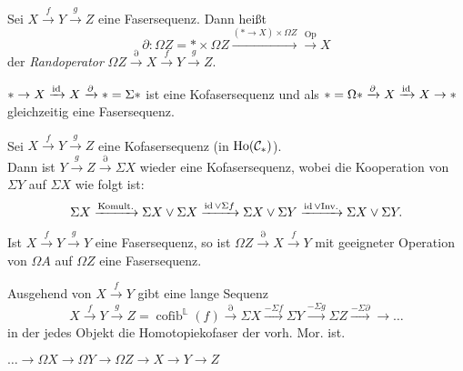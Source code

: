 \documentclass{cheat-sheet}
\DeclareMathOperator{\Ho}{Ho} %
\newcommand{\LL}{\mathbb{L}} %
\DeclareMathOperator{\cofib}{cofib} %
\begin{document}
\begin{dual}
  Sei $X \xrightarrow{f} Y \xrightarrow{g} Z$ eine Fasersequenz.
  Dann heißt
  \[ \partial : \Omega Z = * \times \Omega Z \xrightarrow{(* \to X) \times \Omega Z} \xrightarrow{\text{Op}} X \]
  der \emph{Randoperator} $\Omega Z \xrightarrow{\partial} X \xrightarrow{f} Y \xrightarrow{g} Z$.
\end{dual}

\begin{bsp}
  $* \to X \xrightarrow{\operatorname{id}} X \xrightarrow{\partial} * = \Sigma *$ ist eine Kofasersequenz und als
  $* = \Omega * \xrightarrow{\partial} X \xrightarrow{\operatorname{id}} X \to *$ gleichzeitig eine Fasersequenz.
\end{bsp}

\begin{prop}
  Sei $X \xrightarrow{f} Y \xrightarrow{g} Z$ eine Kofasersequenz (in $\Ho(\Cat_*)$). \\
  Dann ist $Y \xrightarrow{g} Z \xrightarrow{\partial} \Sigma X$ wieder eine Kofasersequenz, wobei die Kooperation von $\Sigma Y$ auf $\Sigma X$ wie folgt ist:
  \[ \Sigma X \xrightarrow{\text{Komult.}} \Sigma X \vee \Sigma X \xrightarrow{\operatorname{id} \vee \Sigma f} \Sigma X \vee \Sigma Y \xrightarrow{\operatorname{id} \vee \text{Inv.}} \Sigma X \vee \Sigma Y. \]
\end{prop}

\begin{dual}
  Ist $X \xrightarrow{f} Y \xrightarrow{g} Y$ eine Fasersequenz, so ist $\Omega Z \xrightarrow{\partial} X \xrightarrow{f} Y$ mit geeigneter Operation von $\Omega A$ auf $\Omega Z$ eine Fasersequenz.
\end{dual}

\begin{kor}
  Ausgehend von $X \xrightarrow{f} Y$ gibt eine lange Sequenz
  \[ X \xrightarrow{f} Y \xrightarrow{g} Z = \cofib^\LL(f) \xrightarrow{\partial} \Sigma X \xrightarrow{- \Sigma f} \Sigma Y \xrightarrow{- \Sigma g} \Sigma Z \xrightarrow{- \Sigma \partial} \to \ldots \]
  in der jedes Objekt die Homotopiekofaser der vorh. Mor. ist.
\end{kor}

\begin{dual}
  $\ldots \to \Omega X \to \Omega Y \to \Omega Z \to X \to Y \to Z$
\end{dual}
\end{document}
